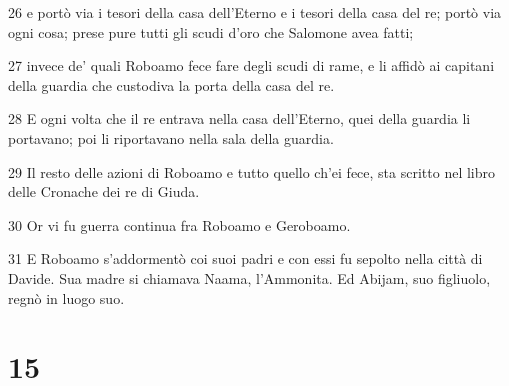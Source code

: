 \par 26 e portò via i tesori della casa dell'Eterno e i tesori della casa del re; portò via ogni cosa; prese pure tutti gli scudi d'oro che Salomone avea fatti;
\par 27 invece de' quali Roboamo fece fare degli scudi di rame, e li affidò ai capitani della guardia che custodiva la porta della casa del re.
\par 28 E ogni volta che il re entrava nella casa dell'Eterno, quei della guardia li portavano; poi li riportavano nella sala della guardia.
\par 29 Il resto delle azioni di Roboamo e tutto quello ch'ei fece, sta scritto nel libro delle Cronache dei re di Giuda.
\par 30 Or vi fu guerra continua fra Roboamo e Geroboamo.
\par 31 E Roboamo s'addormentò coi suoi padri e con essi fu sepolto nella città di Davide. Sua madre si chiamava Naama, l'Ammonita. Ed Abijam, suo figliuolo, regnò in luogo suo.

\chapter{15}

